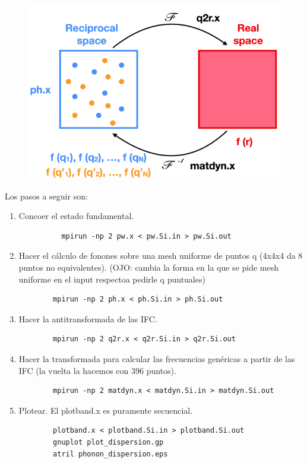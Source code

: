     \begin{figure}[H]
      \centering
      \includegraphics[scale = 0.6]{figs/D5/Fourier.png}
    \end{figure}


  Los pasos a seguir son:
    \begin{enumerate}
      \item Concoer el estado fundamental.
        \begin{verbatim}
          mpirun -np 2 pw.x < pw.Si.in > pw.Si.out
        \end{verbatim}
      \item Hacer el cálculo de fonones sobre una mesh uniforme de puntos q (4x4x4 da 8 puntos no equivalentes). (OJO: cambia la forma en la que se pide mesh uniforme en el input respectoa pedirle q puntuales)
      \begin{verbatim}
        mpirun -np 2 ph.x < ph.Si.in > ph.Si.out
      \end{verbatim}
      \item Hacer la antitransformada de las IFC.
      \begin{verbatim}
        mpirun -np 2 q2r.x < q2r.Si.in > q2r.Si.out
      \end{verbatim}
      \item Hacer la transformada para calcular las frecuencias genéricas a partir de las IFC (la vuelta la hacemos con 396 puntos).
      \begin{verbatim}
        mpirun -np 2 matdyn.x < matdyn.Si.in > matdyn.Si.out
      \end{verbatim}
      \item Plotear. El plotband.x es puramente secuencial.
      \begin{verbatim}
        plotband.x < plotband.Si.in > plotband.Si.out
        gnuplot plot_dispersion.gp
        atril phonon_dispersion.eps
      \end{verbatim}
    \end{enumerate}

